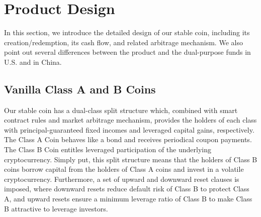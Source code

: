 \documentclass[draft, noinfoline]{ectaart}
\numberwithin{equation}{section}
\theoremstyle{plain}
\begin{document}


\section{Product Design}\label{sec:Product-Design}
In this section, we introduce the detailed design of our stable coin, including its creation/redemption, its cash flow, and related arbitrage mechanism. We also point out several differences between the product and the dual-purpose funds in U.S. and in China.

\subsection{Vanilla Class A and B Coins}\label{subsect:vanilla}

Our stable coin has a dual-class split structure which, combined with smart contract rules and market arbitrage mechanism, provides the holders of each class with principal-guaranteed fixed incomes and leveraged capital gains, respectively. The Class A Coin behaves like a bond and receives periodical coupon payments. The Class B Coin entitles leveraged participation of the underlying cryptocurrency. Simply put, this split structure means that the holders of Class B coins borrow capital from the holders of Class A coins and invest in a volatile cryptocurrency. Furthermore, a set of upward and downward reset clauses is imposed, where downward resets reduce default risk of Class B to protect Class A, and upward resets ensure a minimum leverage ratio of Class B to make Class B attractive to leverage investors.
\end{document}

